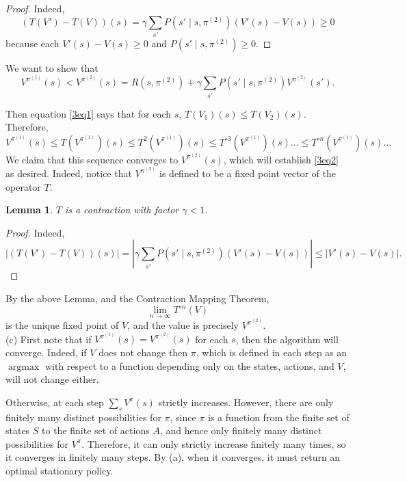 \documentclass[12pt]{article}
\DeclareMathOperator{\argmax}{argmax}
\newtheorem{lemma}[thm]{Lemma}
\theoremstyle{remark}
\begin{document}
\begin{proof}
Indeed, 
\[
(T(V')-T(V))(s) = \gamma \sum_{s'} P(s' \mid s, \pi^{(2)}) (V'(s) - V(s)) \geq 0
\]
because each $V'(s)-V(s) \geq 0$ and $P(s' \mid s, \pi^{(2)}) \geq 0$. 
\end{proof}

We want to show that 
\begin{equation}\label{3eq2}
V^{\pi^{(1)}}(s)  < V^{\pi^{(2)}} (s)  = R(s, \pi^{(2)}) + \gamma \sum_{s'} P(s' \mid s, \pi^{(2)} ) V^{\pi^{(2)}}(s'). 
\end{equation}

 Then equation \eqref{3eq1} says that for each $s$, $T(V_1)(s) \leq T(V_2)(s)$. Therefore, 
\[
V^{\pi^{(1)}}(s) \leq T(V^{\pi^{(1)}})(s) \leq T^2(V^{\pi^{(1)}})(s) \leq T^{\circ 3}(V^{\pi^{(1)}})(s) \ldots \leq T^{\circ n}(V^{\pi^{(1)}})(s) \ldots
\]
We claim that this sequence converges to $V^{\pi^{(2)}}(s)$, which will establish \eqref{3eq2} as desired. Indeed, notice that $V^{\pi^{(2)}}$ is defined to be a fixed point vector of the operator $T$. 

\begin{lemma}
$T$ is a contraction with factor $\gamma < 1$. 
\end{lemma}

\begin{proof}
Indeed, 
\[
|(T(V')-T(V))(s)| = |\gamma \sum_{s'} P(s' \mid s, \pi^{(2)}) (V'(s) - V(s))| \leq |V'(s)-V(s)|.
\]

\end{proof}

By the above Lemma, and the Contraction Mapping Theorem, 
\[
\lim_{n \rightarrow \infty} T^{\circ n}(V) 
\]
is the unique fixed point of $V$, and the value is precisely $V^{\pi^{(2)}}$. \\ 

\noindent (c) First note that if $V^{\pi^{(1)}}(s) = V^{\pi^{(2)}}(s)$ for each $s$, then the algorithm will converge. Indeed, if $V$ does not change then $\pi$, which is defined in each step as an $\argmax$ with respect to a function depending only on the states, actions, and $V$, will not change either. 

Otherwise, at each step $\sum_s V^{\pi}(s)$ strictly increases. However, there are only finitely many distinct possibilities for $\pi$, since $\pi$ is a function from the finite set of states $S$ to the finite set of actions $A$, and hence only finitely many distinct possibilities for $V^{\pi}$. Therefore, it can only strictly increase finitely many times, so it converges in finitely many steps. By (a), when it converges, it must return an optimal stationary policy. 
\end{document}
